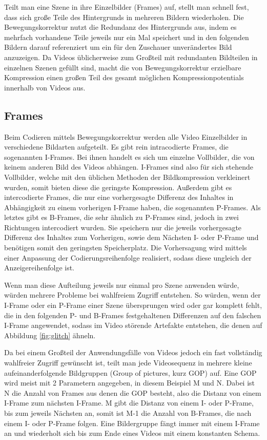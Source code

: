 Teilt man eine Szene in ihre Einzelbilder (Frames) auf, stellt man schnell fest, dass sich große Teile des Hintergrunds in mehreren Bildern wiederholen.
Die Bewegungskorrektur nutzt die Redundanz des Hintergrunds aus, indem es mehrfach vorhandene Teile jeweils nur ein Mal speichert und in den folgenden Bildern darauf referenziert um ein für den Zuschauer unverändertes Bild anzuzeigen.
Da Videos üblicherweise zum Großteil mit redundanten Bildteilen in einzelnen Szenen gefüllt sind, macht die von Bewegungskorrektur erzielbare Kompression einen großen Teil des gesamt möglichen Kompressionpotentials innerhalb von Videos aus.
\subsection{Frames}
Beim Codieren mittels Bewegungskorrektur werden alle Video Einzelbilder in verschiedene Bildarten aufgeteilt.
Es gibt rein intracodierte Frames, die sogenannten I-Frames. Bei ihnen handelt es sich um einzelne Vollbilder, die von keinem anderen Bild des Videos abhängen. I-Frames sind also für sich stehende Vollbilder, welche mit den üblichen Methoden der Bildkompression verkleinert wurden, somit bieten diese die geringste Kompression.
Außerdem gibt es intercodierte Frames, die nur eine vorhergesagte Differenz des Inhaltes in Abhängigkeit zu einem vorherigen I-Frame haben, die sogenannten P-Frames.
Als letztes gibt es B-Frames, die sehr ähnlich zu P-Frames sind, jedoch in zwei Richtungen intercodiert wurden. Sie speichern nur die jeweils vorhergesagte Differenz des Inhaltes zum Vorherigen, sowie dem Nächsten I- oder P-Frame und benötigen somit den geringsten Speicherplatz.
Die Vorhersagung wird mittels einer Anpassung der Codierungsreihenfolge realisiert, sodass diese ungleich der Anzeigereihenfolge ist.\cite{symes_peter_digital_2004}

Wenn man diese Aufteilung jeweils nur einmal pro Szene anwenden würde, würden mehrere Probleme bei wahlfreiem Zugriff entstehen. So würden, wenn der I-Frame oder ein P-Frame einer Szene übersprungen wird oder gar komplett fehlt, die in den folgenden P- und B-Frames festgehaltenen Differenzen auf den falschen I-Frame angewendet, sodass im Video störende Artefakte entstehen, die denen auf Abbildung \ref{fig:glitch} ähneln.

Da bei einem Großteil der Anwendungsfälle von Videos jedoch ein fast vollständig wahlfreier Zugriff gewünscht ist, teilt man jede Videosequenz in mehrere kleine aufeinanderfolgende Bildgruppen (Group of pictures, kurz GOP) auf. Eine GOP wird meist mit 2 Parametern angegeben, in diesem Beispiel M und N.
Dabei ist N die Anzahl von Frames aus denen die GOP besteht, also die Distanz von einem I-Frame zum nächsten I-Frame.
M gibt die Distanz von einem I- oder P-Frame, bis zum jeweils Nächsten an, somit ist M-1 die Anzahl von B-Frames, die nach einem I- oder P-Frame folgen.\cite{huszak2010analysing}
Eine Bildergruppe fängt immer mit einem I-Frame an und wiederholt sich bis zum Ende eines Videos mit einem konstanten Schema.

